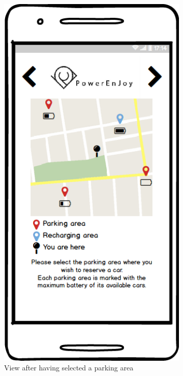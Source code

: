 \begin{figure}[h]
\begin{subfigure}{0.3\paperwidth}
			\includegraphics[scale=0.35]{img/mockups/User_parking_areas.png}
			\caption{View after having selected a parking area}
			\label{fig:subim2}
		\end{subfigure}
		\begin{subfigure}{0.3\paperwidth}
			\centering

\end{subfigure}
\end{figure}
